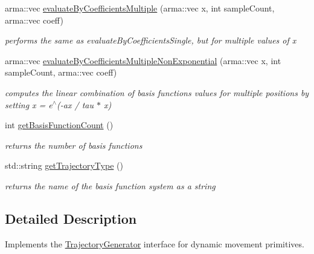 \begin{DoxyCompactItemize}
arma\+::vec \hyperlink{classkukadu_1_1DMPTrajectoryGenerator_affb281e54fbddd566338d3c8e826bd40}{evaluate\+By\+Coefficients\+Multiple} (arma\+::vec x, int sample\+Count, arma\+::vec coeff)
\begin{DoxyCompactList}\small\item\em performs the same as evaluate\+By\+Coefficients\+Single, but for multiple values of x \end{DoxyCompactList}\item 
arma\+::vec \hyperlink{classkukadu_1_1DMPTrajectoryGenerator_a759b1a5b259bcc7ab26554232f94a393}{evaluate\+By\+Coefficients\+Multiple\+Non\+Exponential} (arma\+::vec x, int sample\+Count, arma\+::vec coeff)
\begin{DoxyCompactList}\small\item\em computes the linear combination of basis functions values for multiple positions by setting x = e$^\wedge$(-\/ax / tau $\ast$ x) \end{DoxyCompactList}\item 
int \hyperlink{classkukadu_1_1DMPTrajectoryGenerator_a2554959c04ce802829324fced3bb872b}{get\+Basis\+Function\+Count} ()\hypertarget{classkukadu_1_1DMPTrajectoryGenerator_a2554959c04ce802829324fced3bb872b}{}\label{classkukadu_1_1DMPTrajectoryGenerator_a2554959c04ce802829324fced3bb872b}

\begin{DoxyCompactList}\small\item\em returns the number of basis functions \end{DoxyCompactList}\item 
std\+::string \hyperlink{classkukadu_1_1DMPTrajectoryGenerator_a9b6535bbc5e82c84238ebe41f04bca3f}{get\+Trajectory\+Type} ()\hypertarget{classkukadu_1_1DMPTrajectoryGenerator_a9b6535bbc5e82c84238ebe41f04bca3f}{}\label{classkukadu_1_1DMPTrajectoryGenerator_a9b6535bbc5e82c84238ebe41f04bca3f}

\begin{DoxyCompactList}\small\item\em returns the name of the basis function system as a string \end{DoxyCompactList}\end{DoxyCompactItemize}


\subsection{Detailed Description}
Implements the \hyperlink{classkukadu_1_1TrajectoryGenerator}{Trajectory\+Generator} interface for dynamic movement primitives. 


